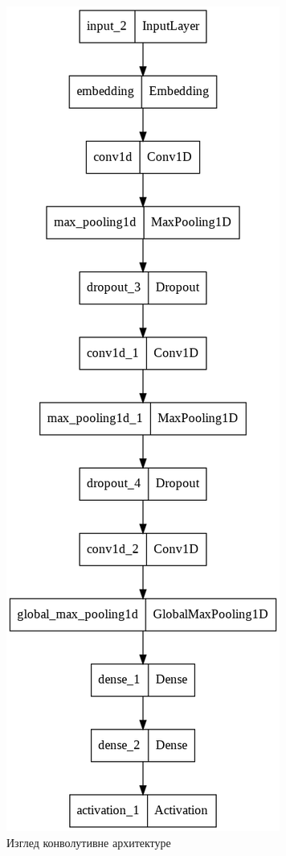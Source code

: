 \documentclass[11pt]{article}
\begin{document}
\begin{figure}[htbp]
\centering
\includegraphics[scale=0.4]{./img/model-cnn.png}
\caption{\label{fig:orge30df59}Изглед конволутивне архитектуре}
\end{figure}
\end{document}
